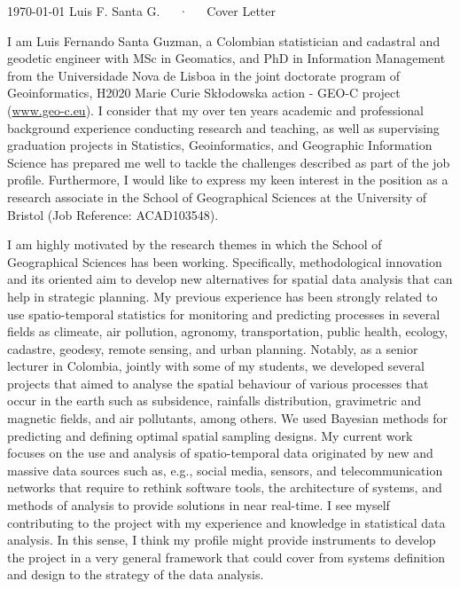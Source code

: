 \documentclass[11pt, a4paper]{awesome-cv}
\begin{document}
\makecvheader[R]

\makecvfooter
  {\today}
    {Luis F. Santa G.~~~·~~~Cover Letter}
  {}

\makelettertitle

\begin{cvletter}
I am Luis Fernando Santa Guzman, a Colombian statistician and cadastral and geodetic engineer with MSc in Geomatics, and PhD in Information Management from the Universidade Nova de Lisboa in the joint doctorate program of Geoinformatics, H2020 Marie Curie Skłodowska action - GEO-C project (\url{www.geo-c.eu}). I consider that my over ten years academic and professional background experience conducting research and teaching, as well as supervising graduation projects in Statistics, Geoinformatics, and Geographic Information Science has prepared me well to tackle the challenges described as part of the job profile. Furthermore, I would like to express my keen interest in the position as a research associate in the School of Geographical Sciences at the University of Bristol (Job Reference: ACAD103548).\par
I am highly motivated by the research themes in which the School of Geographical Sciences has been working. Specifically, methodological innovation and its oriented aim to develop new alternatives for spatial data analysis that can help in strategic planning. My previous experience has been strongly related to use spatio-temporal statistics for monitoring and predicting processes in several fields as climeate, air pollution, agronomy, transportation, public health, ecology,  cadastre, geodesy, remote sensing, and urban planning. Notably, as a senior lecturer in Colombia, jointly with some of my students, we developed several projects that aimed to analyse the spatial behaviour of various processes that occur in the earth such as subsidence, rainfalls distribution, gravimetric and magnetic fields, and air pollutants, among others. We used Bayesian methods for predicting and defining optimal spatial sampling designs. My current work focuses on the use and analysis of spatio-temporal data originated by new and massive data sources such as, e.g., social media, sensors, and telecommunication networks that require to rethink software tools, the architecture of systems, and methods of analysis to provide solutions in near real-time. I see myself contributing to the project with my experience and knowledge in statistical data analysis. In this sense, I think my profile might provide instruments to develop the project in a very general framework that could cover from systems definition and design to the strategy of the data analysis.\par

\end{cvletter}
\end{document}

